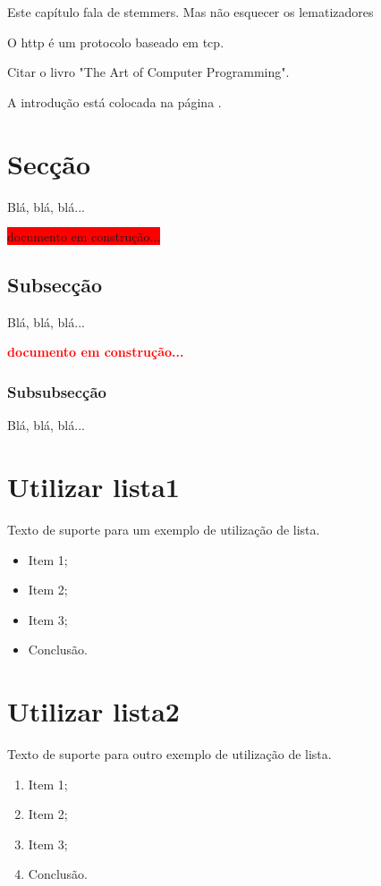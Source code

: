 Este capítulo fala de \gls{stemmer}s. Mas não esquecer os \Gls{lematizador}es

O \acrfull{http} é um protocolo baseado em \acrshort{tcp}.

Citar o livro "The Art of Computer Programming"\cite{knuth1973}.

A introdução está colocada na página \pageref{key:introducao}.


\section{Secção}

Blá, blá, blá...

\colorbox{Red}{documento em construção...}

\subsection{Subsecção}

Blá, blá, blá...

\textbf{\textcolor{Red}{documento em construção...}}


\subsubsection{Subsubsecção}

Blá, blá, blá...


\section{Utilizar lista1}
Texto de suporte para um exemplo de utilização de lista.

\begin{itemize}
	\item Item 1;
	\item Item 2; 
	\item Item 3;
	\item Conclusão.
\end{itemize}{}


\section{Utilizar lista2}
Texto de suporte para outro exemplo de utilização de lista.

\begin{enumerate}
	\item Item 1;
	\item Item 2; 
	\item Item 3;
	\item Conclusão.
\end{enumerate}{}

